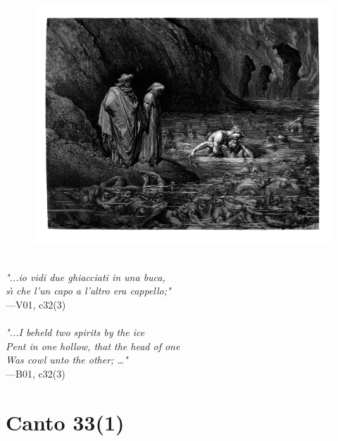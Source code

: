 \documentclass[../Dore_vision.tex]{subfiles}
\begin{document}
\begin{figure}[ht]
\centering
\includegraphics[height=\figsize]{illustrations/book_1/V01, c32(3).jpg}
\end{figure}

\begin{center}
\begin{minipage}{0.8\linewidth}
\textit{\\
"...io vidi due ghiacciati in una buca,\\s\`{\i} che l’un capo a l’altro era cappello;"} \\
—V01, c32(3) \\~\\
\textit{"...I beheld two spirits by the ice\\Pent in one hollow, that the head of one\\Was cowl unto the other; …"} \\
—B01, c32(3)
\end{minipage}
\end{center}

\newpage

\section{Canto 33(1)}
\end{document}
